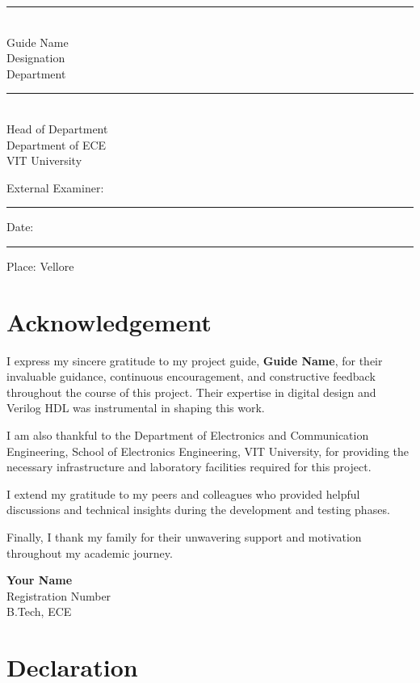\documentclass[12pt,a4paper]{article}
\begin{document}
\vspace{2cm}
\noindent
\begin{minipage}{0.45\textwidth}
    \rule{5cm}{0.4pt}\\Guide Name\\Designation\\Department
\end{minipage}
\hfill
\begin{minipage}{0.45\textwidth}
    \rule{5cm}{0.4pt}\\Head of Department\\Department of ECE\\VIT University
\end{minipage}

\vspace{1cm}
\noindent External Examiner: \rule{5cm}{0.4pt}
\vspace{1cm}
\noindent Date: \rule{3cm}{0.4pt} \hfill Place: Vellore

\clearpage
\chapter*{Acknowledgement}

I express my sincere gratitude to my project guide, \textbf{Guide Name}, for their invaluable guidance, continuous encouragement, and constructive feedback throughout the course of this project. Their expertise in digital design and Verilog HDL was instrumental in shaping this work.

I am also thankful to the Department of Electronics and Communication Engineering, School of Electronics Engineering, VIT University, for providing the necessary infrastructure and laboratory facilities required for this project.

I extend my gratitude to my peers and colleagues who provided helpful discussions and technical insights during the development and testing phases.

Finally, I thank my family for their unwavering support and motivation throughout my academic journey.

\vspace{1cm}
\noindent\textbf{Your Name}\\Registration Number\\B.Tech, ECE

\clearpage
\chapter*{Declaration}
\end{document}
